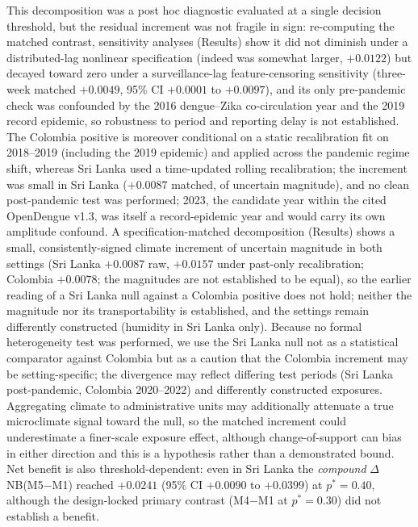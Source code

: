 \documentclass[11pt,a4paper]{article}
\begin{document}
This decomposition was a post hoc diagnostic evaluated at a single decision threshold, but the residual increment was not fragile in sign: re-computing the matched contrast, sensitivity analyses (Results) show it did not diminish under a distributed-lag nonlinear specification (indeed was somewhat larger, $+0.0122$) but decayed toward zero under a surveillance-lag feature-censoring sensitivity (three-week matched $+0.0049$, 95\% CI $+0.0001$ to $+0.0097$), and its only pre-pandemic check was confounded by the 2016 dengue--Zika co-circulation year and the 2019 record epidemic, so robustness to period and reporting delay is not established. The Colombia positive is moreover conditional on a static recalibration fit on 2018--2019 (including the 2019 epidemic) and applied across the pandemic regime shift, whereas Sri Lanka used a time-updated rolling recalibration; the increment was small in Sri Lanka ($+0.0087$ matched, of uncertain magnitude), and no clean post-pandemic test was performed; 2023, the candidate year within the cited OpenDengue v1.3, was itself a record-epidemic year and would carry its own amplitude confound. A specification-matched decomposition (Results) shows a small, consistently-signed climate increment of uncertain magnitude in both settings (Sri Lanka $+0.0087$ raw, $+0.0157$ under past-only recalibration; Colombia $+0.0078$; the magnitudes are not established to be equal), so the earlier reading of a Sri Lanka null against a Colombia positive does not hold; neither the magnitude nor its transportability is established, and the settings remain differently constructed (humidity in Sri Lanka only). Because no formal heterogeneity test was performed, we use the Sri Lanka null not as a statistical comparator against Colombia but as a caution that the Colombia increment may be setting-specific; the divergence may reflect differing test periods (Sri Lanka post-pandemic, Colombia 2020--2022) and differently constructed exposures. Aggregating climate to administrative units may additionally attenuate a true microclimate signal toward the null, so the matched increment could underestimate a finer-scale exposure effect, although change-of-support can bias in either direction and this is a hypothesis rather than a demonstrated bound. Net benefit is also threshold-dependent: even in Sri Lanka the \emph{compound} $\Delta$NB(M5$-$M1) reached $+0.0241$ (95\% CI $+0.0090$ to $+0.0399$) at $p^*=0.40$, although the design-locked primary contrast (M4$-$M1 at $p^*=0.30$) did not establish a benefit.
\end{document}
